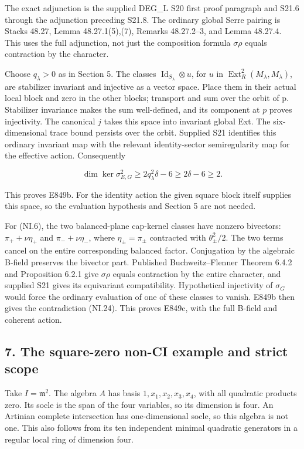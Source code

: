 The exact adjunction is the supplied DEG\_L S20 first proof
paragraph and S21.6 through the adjunction preceding S21.8.
The ordinary global Serre pairing is Stacks 48.27,
Lemma 48.27.1(5),(7), Remarks 48.27.2--3, and Lemma 48.27.4.\cite{SFStacksE846Duality}
This uses the full adjunction, not just the composition
formula \(\sigma\rho\) equals contraction by the character.

Choose \(q_{\lambda}>0\) as in Section 5. The classes \(\operatorname{Id}_{S_\lambda}\otimes u\), for \(u\) in \(\operatorname{Ext}^2_R(M_{\lambda},M_{\lambda})\), are stabilizer
invariant and injective as a vector space. Place them in their
actual local block and zero in the other blocks; transport and
sum over the orbit of p. Stabilizer invariance makes the sum
well-defined, and its component at \(p\) proves injectivity. The
canonical \(j\) takes this space into invariant global Ext. The
six-dimensional trace bound persists over the orbit. Supplied
S21 identifies this ordinary invariant map with the relevant
identity-sector semiregularity map for the effective action.
Consequently

\[
 \dim\ker\sigma^2_{E,G}
       \ge2q_\lambda^2\delta-6
       \ge2\delta-6\ge2.
 \tag{NI.24}
\]

This proves E849b. For the identity action the given square
block itself supplies this space, so the evaluation hypothesis
and Section 5 are not needed.

For (NI.6), the two balanced-plane cap-kernel classes have
nonzero bivectors: \(\pi_++\nu\eta_+\) and \(\pi_-+\nu\eta_-\), where
\(\eta_{\pm}=\pi_{\pm}\) contracted with \(\theta_{\pm}^2/2\). The two terms cancel
on the entire corresponding balanced factor. Conjugation by
the algebraic B-field preserves the bivector part. Published
Buchweitz--Flenner Theorem 6.4.2 and Proposition 6.2.1\cite{SF-BF2008} give
\(\sigma\rho\) equals contraction by the entire character, and supplied S21
gives its equivariant compatibility. Hypothetical injectivity
of \(\sigma_G\) would force the ordinary evaluation of one of these
classes to vanish. E849b then gives the contradiction (NI.24).
This proves E849c, with the full B-field and coherent action.

\subsection{7. The square-zero non-CI example and strict scope}\label{SF-E849:s7}

Take \(I=\mathfrak m^2\). The algebra \(A\) has basis \(1,x_1,x_2,x_3,x_4\), with
all quadratic products zero. Its socle is the span of the four
variables, so its dimension is four. An Artinian complete
intersection has one-dimensional socle, so this algebra is not
one. This also follows from its ten independent minimal
quadratic generators in a regular local ring of dimension four.

